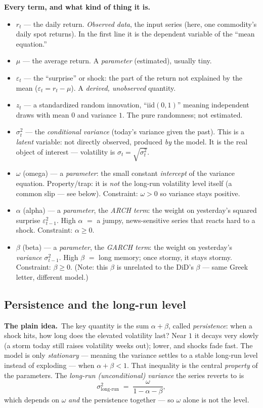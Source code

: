 \documentclass[11pt]{article}
\newcommand{\intuit}{\smallskip\noindent\textbf{The plain idea.}\ }
\newcommand{\vars}{\smallskip\noindent\textbf{Every term, and what kind of thing it is.}\ }
\begin{document}
\vars
\begin{itemize}
\item $r_t$ --- the daily return. \emph{Observed data}, the input series (here, one commodity's
daily spot returns). In the first line it is the dependent variable of the ``mean equation.''
\item $\mu$ --- the average return. A \emph{parameter} (estimated), usually tiny.
\item $\varepsilon_t$ --- the ``surprise'' or shock: the part of the return not explained by the
mean ($\varepsilon_t = r_t - \mu$). A \emph{derived, unobserved} quantity.
\item $z_t$ --- a standardized random innovation, ``iid$(0,1)$'' meaning independent draws with mean
$0$ and variance $1$. The pure randomness; not estimated.
\item $\sigma_t^2$ --- the \emph{conditional variance} (today's variance given the past). This is a
\emph{latent} variable: not directly observed, produced \emph{by} the model. It is the real object
of interest --- volatility is $\sigma_t = \sqrt{\sigma_t^2}$.
\item $\omega$ (omega) --- a \emph{parameter}: the small constant \emph{intercept} of the variance
equation. Property/trap: it is \emph{not} the long-run volatility level itself (a common slip ---
see below). Constraint: $\omega>0$ so variance stays positive.
\item $\alpha$ (alpha) --- a \emph{parameter}, the \emph{ARCH term}: the weight on yesterday's
squared surprise $\varepsilon_{t-1}^2$. High $\alpha$ $=$ a jumpy, news-sensitive series that reacts
hard to a shock. Constraint: $\alpha \ge 0$.
\item $\beta$ (beta) --- a \emph{parameter}, the \emph{GARCH term}: the weight on yesterday's
\emph{variance} $\sigma_{t-1}^2$. High $\beta$ $=$ long memory; once stormy, it stays stormy.
Constraint: $\beta \ge 0$. (Note: this $\beta$ is unrelated to the DiD's $\beta$ --- same Greek
letter, different model.)
\end{itemize}

\subsection{Persistence and the long-run level}

\intuit The key quantity is the sum $\alpha + \beta$, called \emph{persistence}: when a shock hits,
how long does the elevated volatility last? Near $1$ it decays very slowly (a storm today still
raises volatility weeks out); lower, and shocks fade fast. The model is only \emph{stationary} ---
meaning the variance settles to a stable long-run level instead of exploding --- when
$\alpha + \beta < 1$. That inequality is the central \emph{property} of the parameters. The
\emph{long-run (unconditional) variance} the series reverts to is
\[
\sigma^2_{\text{long-run}} \;=\; \frac{\omega}{1 - \alpha - \beta},
\]
which depends on $\omega$ \emph{and} the persistence together --- so $\omega$ alone is not the level.
\end{document}
